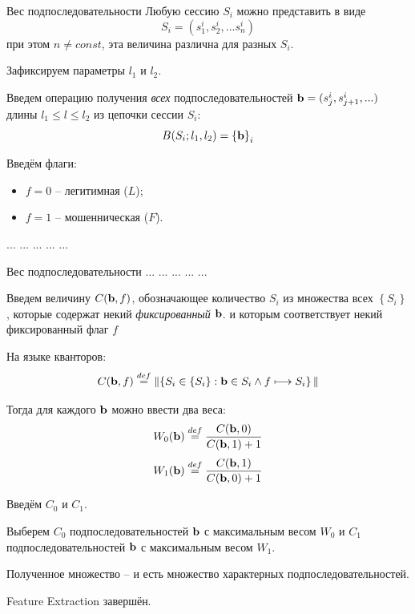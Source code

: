 \begin{frame}{Вес подпоследовательности}
	\small
	Любую сессию $S_i$ можно представить в виде
	\begin{equation}
	S_i = \left( s_1^i, s_2^i, ... s_n^i\right)
	\end{equation}
	при этом $n \neq const$, эта величина различна для разных $S_i$.
	
	Зафиксируем параметры $l_1$ и $l_2$.
	
	Введем операцию получения \textit{всех} подпоследовательностей $\bold b = (s_j^i, s_{j+1}^i, ...)$ длины $l_1 \leqslant l \leqslant l_2$
	из цепочки сессии $S_i$:
	\begin{equation}
	B(S_i ; l_1, l_2) = \left\{ \bold b \right\}_i
	\end{equation}
	
	Введём флаги:
	\begin{itemize}
		\item $f=0$ -- легитимная ($L$);
		\item $f=1$ -- мошенническая ($F$).
	\end{itemize}

	... ... ... ... ...
\end{frame}


\begin{frame}{Вес подпоследовательности}
	\small
	... ... ... ... ...
	
	Введем величину $C(\bold b, f)$, обозначающее количество $S_i$ из множества всех $\left\{ S_i \right\}$,
	которые содержат некий \textit{фиксированный} $\bold b$. 
	и которым соответствует некий фиксированный флаг $f$  
	
	На языке кванторов:
	\begin{equation}
	C(\bold b, f) \stackrel{def}{=} \lVert
		\left\{ 
			S_i \in  \left\{S_i\right\}   : \bold b \in S_i 
			\wedge f \longmapsto S_i
		\right\}
	\lVert
	\end{equation}
	
	Тогда для каждого $\bold b$ можно ввести два веса:
	\begin{equation}\label{eq:W_0_simple}
	W_0 (\bold b) \stackrel{def}{=} \frac{C(\bold b, 0)}{C(\bold b, 1) + 1}
	\end{equation}
	\begin{equation}\label{eq:W_1_simple}
	W_1 (\bold b) \stackrel{def}{=} \frac{C(\bold b, 1)}{C(\bold b, 0) + 1}
	\end{equation}
\end{frame}

\begin{frame}
	Введём  $C_0$ и $C_1$.
	
	Выберем $C_0$ подпоследовательностей $\bold b$ с максимальным весом $W_0$
	и $C_1$ подпоследовательностей $\bold b$ с максимальным весом $W_1$.
	
	Полученное множество -- и есть множество характерных подпоследовательностей.
	
	Feature Extraction завершён.

\end{frame}
	
